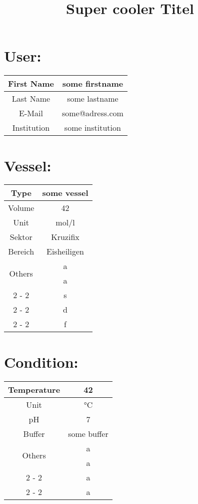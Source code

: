 \documentclass{article}%
\title{Super cooler Titel}%
\begin{document}
%
\normalsize%
\maketitle%
\section{User:}%
\label{sec:User}%
\begin{tabular}{|c|c|}%
\hline%
First Name&some firstname\\%
\hline%
Last Name&some lastname\\%
\hline%
E{-}Mail&some@adress.com\\%
\hline%
Institution&some institution\\%
\hline%
\end{tabular}

%
\section{Vessel:}%
\label{sec:Vessel}%
\begin{tabular}{|c|c|}%
\hline%
Type&some vessel\\%
\hline%
Volume&42\\%
\hline%
Unit&mol/l\\%
\hline%
Sektor&Kruzifix\\%
\hline%
Bereich&Eisheiligen\\%
\hline%
\multirow{2}{*}{Others}&a\\%
\cline{2%
-%
2}%
&a\\%
\cline{2%
-%
2}%
&s\\%
\cline{2%
-%
2}%
&d\\%
\cline{2%
-%
2}%
&f\\%
\hline%
\end{tabular}

%
\section{Condition:}%
\label{sec:Condition}%
\begin{tabular}{|c|c|}%
\hline%
Temperature&42\\%
\hline%
Unit&°C\\%
\hline%
pH&7\\%
\hline%
Buffer&some buffer\\%
\hline%
\multirow{2}{*}{Others}&a\\%
\cline{2%
-%
2}%
&a\\%
\cline{2%
-%
2}%
&a\\%
\cline{2%
-%
2}%
&a\\%
\hline%
\end{tabular}

%
\end{document}
